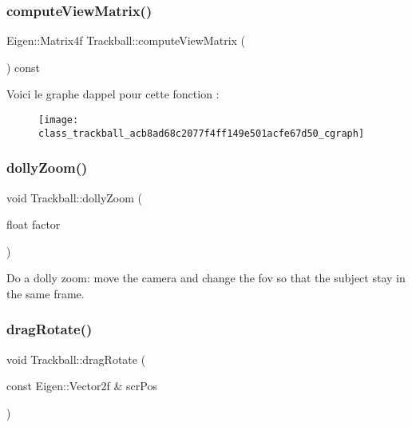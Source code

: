 \subsubsection{\texorpdfstring{compute\+View\+Matrix()}{computeViewMatrix()}}
{\footnotesize\ttfamily Eigen\+::\+Matrix4f Trackball\+::compute\+View\+Matrix (\begin{DoxyParamCaption}{ }\end{DoxyParamCaption}) const}

Voici le graphe d\textquotesingle{}appel pour cette fonction \+:\nopagebreak
\begin{figure}[H]
\begin{center}
\leavevmode
\texttt{[image: class\_trackball\_acb8ad68c2077f4ff149e501acfe67d50\_cgraph]}
\end{center}
\end{figure}
\mbox{\label{class_trackball_a12d2e0436352bb7d222e2a3aed39e41c}} 
\subsubsection{\texorpdfstring{dolly\+Zoom()}{dollyZoom()}}
{\footnotesize\ttfamily void Trackball\+::dolly\+Zoom (\begin{DoxyParamCaption}\item[{float}]{factor }\end{DoxyParamCaption})}



Do a dolly zoom\+: move the camera and change the fov so that the subject stay in the same frame. 

\mbox{\label{class_trackball_a1dcd5aef16fd43aabfc0099183202437}} 
\subsubsection{\texorpdfstring{drag\+Rotate()}{dragRotate()}}
{\footnotesize\ttfamily void Trackball\+::drag\+Rotate (\begin{DoxyParamCaption}\item[{const Eigen\+::\+Vector2f \&}]{scr\+Pos }\end{DoxyParamCaption})}

